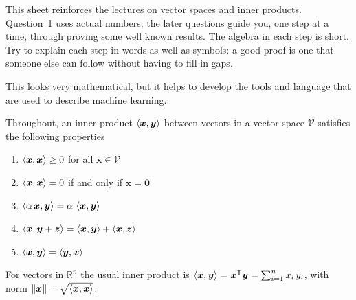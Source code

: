 \documentclass{sotonExamBoxes}    %
\begin{document}


\maketitle

This sheet reinforces the lectures on vector spaces and inner
products.  Question~1 uses actual numbers; the later questions guide
you, one step at a time, through proving some well known results.  The
algebra in each step is short.  Try to explain each step in words as
well as symbols: a good proof is one that someone else can follow
without having to fill in gaps.

This looks very mathematical, but it helps to develop the tools and
language that are used to describe machine learning.

Throughout, an inner product $\left\langle \bm{x}, \bm{y}\right\rangle$ between vectors
in a vector space $\mathcal{V}$ satisfies the following properties
{\renewcommand{\labelenumi}{\arabic{enumi}.}
\begin{enumerate}\squeeze
\item $\left\langle \bm{x}, \bm{x}\right\rangle \geq 0$ for all $\bm{x}\in\mathcal{V}$
\item $\left\langle \bm{x}, \bm{x}\right\rangle = 0$  if and only if $\bm{x}=\bm{0}$
\item $\left\langle \alpha\, \bm{x}, \bm{y}\right\rangle = \alpha\,
  \left\langle \bm{x}, \bm{y}\right\rangle$
\item $\left\langle \bm{x}, \bm{y}+\bm{z}\right\rangle = \left\langle \bm{x}, \bm{y}\right\rangle +
  \left\langle \bm{x}, \bm{z}\right\rangle$
\item $\left\langle \bm{x}, \bm{y}\right\rangle = \left\langle \bm{y}, \bm{x}\right\rangle$
\end{enumerate}}
For vectors in $\mathbb{R}^n$ the usual inner product is
$\left\langle \bm{x}, \bm{y}\right\rangle = \bm{x}^{\textsf{T}}\bm{y} = \sum_{i=1}^n x_i\,y_i$,
with norm $\| \bm{x} \| = \sqrt{\left\langle \bm{x}, \bm{x}\right\rangle}$.



\end{document}
